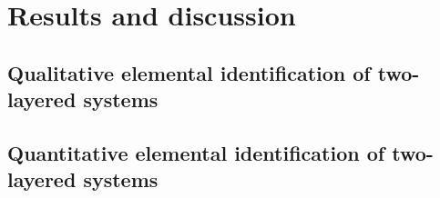 


\chapter{Results and discussion} %

\label{Chapter4}



\section{Qualitative elemental identification of two-layered systems}


\section{Quantitative elemental identification of two-layered systems}




